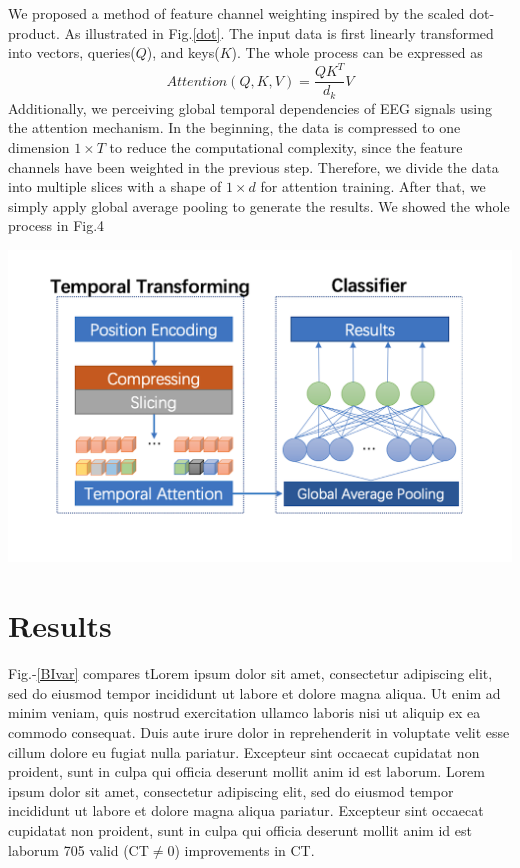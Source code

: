 \documentclass[a0,portrait]{a0poster}
\begin{document}
\begin{minipage}[c]{\linewidth}
\begin{framed}
\begin{multicols}{2}
We proposed a method of feature channel weighting inspired by the scaled dot-product. As illustrated in Fig.\ref{dot}. The input data is first linearly transformed into vectors, queries($Q$), and keys($K$). The whole process can be expressed as $$Attention(Q, K, V) = \frac{QK^{T}}{d_k}V$$Additionally, we perceiving global temporal dependencies of EEG signals using the attention mechanism. In the beginning, the data is compressed to one dimension $1{\times}T$ to reduce the computational complexity, since the feature channels have been weighted in the previous step. Therefore, we divide the data into multiple slices with a shape of $1{\times}d$ for attention training. After that, we simply apply global average pooling to generate the results. We showed the whole process in Fig.4\\
\begin {center}
\includegraphics{figures/process}
\label{process}
\end{center}
\color{Black}
\section*{Results}
Fig.-\ref{BIvar} compares tLorem ipsum dolor sit amet, consectetur adipiscing elit, sed do eiusmod tempor incididunt ut labore et dolore magna aliqua. Ut enim ad minim veniam, quis nostrud exercitation ullamco laboris nisi ut aliquip ex ea commodo consequat. Duis aute irure dolor in reprehenderit in voluptate velit esse cillum dolore eu fugiat nulla pariatur. Excepteur sint occaecat cupidatat non proident, sunt in culpa qui officia deserunt mollit anim id est laborum.
Lorem ipsum dolor sit amet, consectetur adipiscing elit, sed do eiusmod tempor incididunt ut labore et dolore magna aliqua pariatur. Excepteur sint occaecat cupidatat non proident, sunt in culpa qui officia deserunt mollit anim id est laborum 705 valid (CT$\neq$0) improvements in CT.


\end{multicols}
\end{framed}
\end{minipage}
\end{document}
